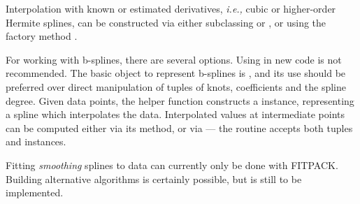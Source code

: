 Interpolation with known or estimated derivatives, \textit{i.e.,} cubic or higher-order Hermite splines, can be constructed via either subclassing  or , or using the factory method .

For working with b-splines, there are several options. Using  in new code is not recommended. The basic object to represent b-splines is , and its use should be preferred over direct manipulation of  tuples of knots, coefficients and the spline degree. Given data points, the helper function  constructs a  instance, representing a spline which interpolates the data. Interpolated values at intermediate points can be computed either via its  method, or via  --- the  routine accepts both  tuples and  instances.

Fitting \emph{smoothing} splines to data can currently only be done with FITPACK. Building alternative algorithms is certainly possible, but is still to be implemented.

